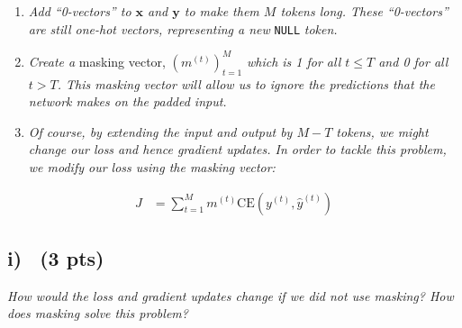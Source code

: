 \documentclass[fleqn]{MJD}
\newcommand{\subsubproblem}[2]{\subsection{ #1)~ #2}}
\newcommand{\0}{\emptyset}
\begin{document}
\begin{enumerate}
	\item \textit{Add ``0-vectors'' to $\bm{x}$ and $\bm{y}$ to make them $M$ tokens long. These ``0-vectors'' are still one-hot vectors, representing a new} \verb|NULL| \textit{token.}
	\item \textit{Create a} masking vector, $\left( m^{(t)} \right)_{t=1}^{M}$ \textit{which is 1 for all $t \leq T$ and 0 for all $t > T$. This masking vector will allow us to ignore the predictions that the network makes on the padded input.}
	\item \textit{Of course, by extending the input and output by $M-T$ tokens, we might change our loss and hence gradient updates. In order to tackle this problem, we modify our loss using the masking vector:}
\end{enumerate}
%
\vspace*{-1em}
%
\begin{align}
	J &= \sum_{t=1}^{M} m^{(t)} \text{CE} \left( y^{(t)} , \hat{y}^{(t)} \right) \nonumber
\end{align}



\subsubproblem{i}{(3 pts)}

\textit{How would the loss and gradient updates change if we did not use masking? How does masking solve this problem?}
\end{document}
